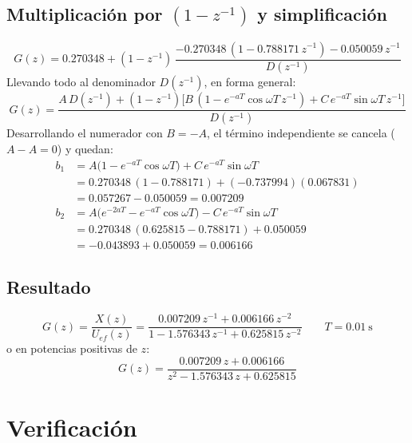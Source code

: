 \documentclass[11pt,letterpaper]{article}
\begin{document}
\subsection{Multiplicación por $(1-z^{-1})$ y simplificación}
\begin{equation}
  G(z) = 0.270348
  + (1-z^{-1})\,\frac{-0.270348\,(1 - 0.788171\,z^{-1}) - 0.050059\,z^{-1}}{D(z^{-1})}
\end{equation}
Llevando todo al denominador $D(z^{-1})$, en forma general:
\begin{equation}
  G(z) = \frac{A\,D(z^{-1}) + (1-z^{-1})\bigl[B\,(1 - e^{-aT}\cos\omega T\,z^{-1})
         + C\,e^{-aT}\sin\omega T\,z^{-1}\bigr]}{D(z^{-1})}
\end{equation}
Desarrollando el numerador con $B=-A$, el término independiente se cancela
($A - A = 0$) y quedan:
\begin{align}
  b_1 &= A\bigl(1 - e^{-aT}\cos\omega T\bigr) + C\,e^{-aT}\sin\omega T \nonumber\\
      &= 0.270348\,(1 - 0.788171) + (-0.737994)(0.067831) \nonumber\\
      &= 0.057267 - 0.050059 = 0.007209\\[4pt]
  b_2 &= A\bigl(e^{-2aT} - e^{-aT}\cos\omega T\bigr) - C\,e^{-aT}\sin\omega T \nonumber\\
      &= 0.270348\,(0.625815 - 0.788171) + 0.050059 \nonumber\\
      &= -0.043893 + 0.050059 = 0.006166
\end{align}

\subsection{Resultado}
\begin{equation}
  \boxed{G(z) = \frac{X(z)}{U_{ef}(z)} =
  \frac{0.007209\,z^{-1} + 0.006166\,z^{-2}}{1 - 1.576343\,z^{-1} + 0.625815\,z^{-2}}
  \qquad T = 0.01~\text{s}}
  \label{eq:Gz}
\end{equation}
o en potencias positivas de $z$:
\begin{equation}
  G(z) = \frac{0.007209\,z + 0.006166}{z^2 - 1.576343\,z + 0.625815}
\end{equation}

\section{Verificación}
\end{document}
